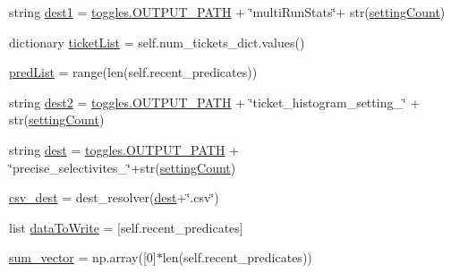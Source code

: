 \begin{DoxyCompactItemize}
\item 
string \mbox{\hyperlink{classdynamicfilterapp_1_1test__simulations_1_1_simulation_test_a378bd708ce64c9205a9d5b7ef5179008}{dest1}} = \mbox{\hyperlink{namespacedynamicfilterapp_1_1toggles_a04644ded1d5e3fc8bd58a411209b7886}{toggles.\+O\+U\+T\+P\+U\+T\+\_\+\+P\+A\+TH}} + \char`\"{}multi\+Run\+Stats\char`\"{}+ str(\mbox{\hyperlink{classdynamicfilterapp_1_1test__simulations_1_1_simulation_test_a18e9dc3d267483ccc2dbacf54439c5ff}{setting\+Count}})
\item 
dictionary \mbox{\hyperlink{classdynamicfilterapp_1_1test__simulations_1_1_simulation_test_a730cc0ea27c2fcb7b9cacd041f88e6fc}{ticket\+List}} = self.\+num\+\_\+tickets\+\_\+dict.\+values()
\item 
\mbox{\hyperlink{classdynamicfilterapp_1_1test__simulations_1_1_simulation_test_a8c4afebfe163bfabdc976314d726eca9}{pred\+List}} = range(len(self.\+recent\+\_\+predicates))
\item 
string \mbox{\hyperlink{classdynamicfilterapp_1_1test__simulations_1_1_simulation_test_a55df54097e78f89cfbea1eac42c38c6c}{dest2}} = \mbox{\hyperlink{namespacedynamicfilterapp_1_1toggles_a04644ded1d5e3fc8bd58a411209b7886}{toggles.\+O\+U\+T\+P\+U\+T\+\_\+\+P\+A\+TH}} + \char`\"{}ticket\+\_\+histogram\+\_\+setting\+\_\+\char`\"{} + str(\mbox{\hyperlink{classdynamicfilterapp_1_1test__simulations_1_1_simulation_test_a18e9dc3d267483ccc2dbacf54439c5ff}{setting\+Count}})
\item 
string \mbox{\hyperlink{classdynamicfilterapp_1_1test__simulations_1_1_simulation_test_a66d4da94e0e4f717ff3e7f23c53f7c2d}{dest}} = \mbox{\hyperlink{namespacedynamicfilterapp_1_1toggles_a04644ded1d5e3fc8bd58a411209b7886}{toggles.\+O\+U\+T\+P\+U\+T\+\_\+\+P\+A\+TH}} + \char`\"{}precise\+\_\+selectivites\+\_\+\char`\"{}+str(\mbox{\hyperlink{classdynamicfilterapp_1_1test__simulations_1_1_simulation_test_a18e9dc3d267483ccc2dbacf54439c5ff}{setting\+Count}})
\item 
\mbox{\hyperlink{classdynamicfilterapp_1_1test__simulations_1_1_simulation_test_a6eed7f11544aaf90c0880db171d103a6}{csv\+\_\+dest}} = dest\+\_\+resolver(\mbox{\hyperlink{classdynamicfilterapp_1_1test__simulations_1_1_simulation_test_a66d4da94e0e4f717ff3e7f23c53f7c2d}{dest}}+\char`\"{}.csv\char`\"{})
\item 
list \mbox{\hyperlink{classdynamicfilterapp_1_1test__simulations_1_1_simulation_test_a213f043d9f337910e40da2aac8b37a87}{data\+To\+Write}} = \mbox{[}self.\+recent\+\_\+predicates\mbox{]}
\item 
\mbox{\hyperlink{classdynamicfilterapp_1_1test__simulations_1_1_simulation_test_a418948863130332c47bda07a24a9866f}{sum\+\_\+vector}} = np.\+array(\mbox{[}0\mbox{]}$\ast$len(self.\+recent\+\_\+predicates))

\end{DoxyCompactItemize}
